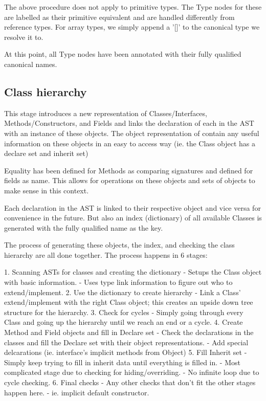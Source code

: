 \documentclass[12pt]{article}
\begin{document}
The above procedure does not apply to primitive types.  The Type nodes for these
are labelled as their primitive equivalent and are handled differently from
reference types.
For array types, we simply append a '[]' to the canonical type
we resolve it to.

At this point, all Type nodes have been annotated with their fully qualified
canonical names.

\subsection{Class hierarchy}
This stage introduces a new representation of Classes/Interfaces,
Methods/Constructors, and Fields and links the declaration of each in the AST
with an instance of these objects. The object representation of contain
any useful information on these objects in an easy to access way (ie.
the Class object has a declare set and inherit set)

Equality has been defined for Methods as
comparing signatures and defined for fields as name. This allows for operations
on these objects and sets of objects to make sense in this context.

Each declaration in the AST is linked to their respective object and vice versa
for convenience in the future. But also an index (dictionary) of all available Classes
is generated with the fully qualified name as the key.

The process of generating these objects, the index, and checking the
class hierarchy are all done together. 
The process happens in 6 stages:

1. Scanning ASTs for classes and creating the dictionary
    - Setups the Class object with basic information.
    - Uses type link information to figure out who to extend/implement.
2. Use the dictionary to create hierarchy
    - Link a Class' extend/implement with the right Class object; this creates
    an upside down tree structure for the hierarchy.
3. Check for cycles
    - Simply going through every Class and going up the hierarchy
    until we reach an end or a cycle.
4. Create Method and Field objects and fill in Declare set
    - Check the declarations in the classes and fill the Declare set
    with their object representations.
    - Add special delcarations (ie. interface's implicit methods from Object)
5. Fill Inherit set
    - Simply keep trying to fill in inherit data until everything is filled in.
    - Most complicated stage due to checking for hiding/overriding.
    - No infinite loop due to cycle checking.
6. Final checks
    - Any other checks that don't fit the other stages happen here.
    - ie. implicit default constructor.
\end{document}
